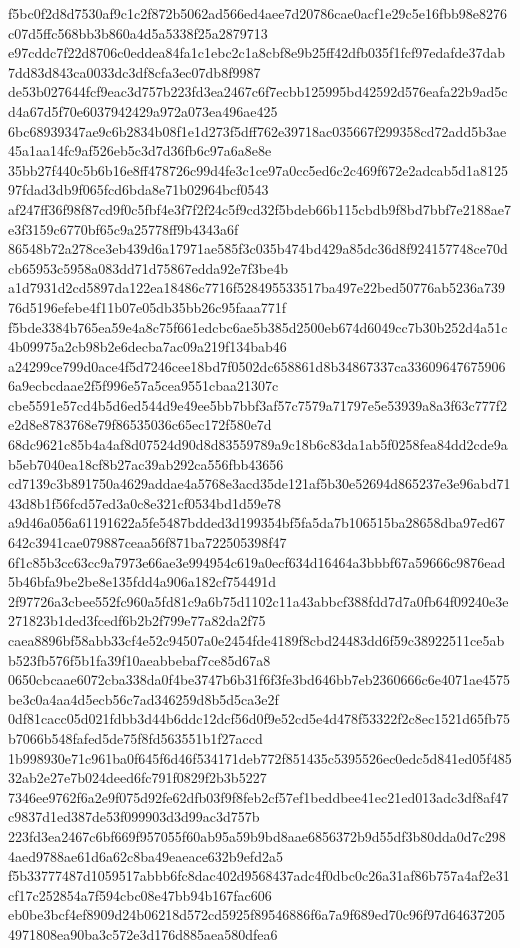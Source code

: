 \documentclass[11pt,a4paper]{article}
\begin{document}
{f5bc0f2d8d7530af9c1c2f872b5062ad566ed4aee7d20786cae0acf1e29c5e16fbb98e8276c07d5ffc568bb3b860a4d5a5338f25a2879713
e97cddc7f22d8706c0eddea84fa1c1ebc2c1a8cbf8e9b25ff42dfb035f1fcf97edafde37dab7dd83d843ca0033dc3df8cfa3ec07db8f9987
de53b027644fcf9eac3d757b223fd3ea2467c6f7ecbb125995bd42592d576eafa22b9ad5cd4a67d5f70e6037942429a972a073ea496ae425
6bc68939347ae9c6b2834b08f1e1d273f5dff762e39718ac035667f299358cd72add5b3ae45a1aa14fc9af526eb5c3d7d36fb6c97a6a8e8e
35bb27f440c5b6b16e8ff478726c99d4fe3c1ce97a0cc5ed6c2c469f672e2adcab5d1a812597fdad3db9f065fcd6bda8e71b02964bcf0543
af247ff36f98f87cd9f0c5fbf4e3f7f2f24c5f9cd32f5bdeb66b115cbdb9f8bd7bbf7e2188ae7e3f3159c6770bf65c9a25778ff9b4343a6f
86548b72a278ce3eb439d6a17971ae585f3c035b474bd429a85dc36d8f924157748ce70dcb65953c5958a083dd71d75867edda92e7f3be4b
a1d7931d2cd5897da122ea18486c7716f528495533517ba497e22bed50776ab5236a73976d5196efebe4f11b07e05db35bb26c95faaa771f
f5bde3384b765ea59e4a8c75f661edcbc6ae5b385d2500eb674d6049cc7b30b252d4a51c4b09975a2cb98b2e6decba7ac09a219f134bab46
a24299ce799d0ace4f5d7246cee18bd7f0502dc658861d8b34867337ca336096476759066a9ecbcdaae2f5f996e57a5cea9551cbaa21307c
cbe5591e57cd4b5d6ed544d9e49ee5bb7bbf3af57c7579a71797e5e53939a8a3f63c777f2e2d8e8783768e79f86535036c65ec172f580e7d
68dc9621c85b4a4af8d07524d90d8d83559789a9c18b6c83da1ab5f0258fea84dd2cde9ab5eb7040ea18cf8b27ac39ab292ca556fbb43656
cd7139c3b891750a4629addae4a5768e3acd35de121af5b30e52694d865237e3e96abd7143d8b1f56fcd57ed3a0c8e321cf0534bd1d59e78
a9d46a056a61191622a5fe5487bdded3d199354bf5fa5da7b106515ba28658dba97ed67642c3941cae079887ceaa56f871ba722505398f47
6f1c85b3cc63cc9a7973e66ae3e994954c619a0ecf634d16464a3bbbf67a59666c9876ead5b46bfa9be2be8e135fdd4a906a182cf754491d
2f97726a3cbee552fc960a5fd81c9a6b75d1102c11a43abbcf388fdd7d7a0fb64f09240e3e271823b1ded3fcedf6b2b2f799e77a82da2f75
caea8896bf58abb33cf4e52c94507a0e2454fde4189f8cbd24483dd6f59c38922511ce5abb523fb576f5b1fa39f10aeabbebaf7ce85d67a8
0650cbcaae6072cba338da0f4be3747b6b31f6f3fe3bd646bb7eb2360666c6e4071ae4575be3c0a4aa4d5ecb56c7ad346259d8b5d5ca3e2f
0df81cacc05d021fdbb3d44b6ddc12dcf56d0f9e52cd5e4d478f53322f2c8ec1521d65fb75b7066b548fafed5de75f8fd563551b1f27accd
1b998930e71c961ba0f645f6d46f534171deb772f851435c5395526ec0edc5d841ed05f48532ab2e27e7b024deed6fc791f0829f2b3b5227
7346ee9762f6a2e9f075d92fe62dfb03f9f8feb2cf57ef1beddbee41ec21ed013adc3df8af47c9837d1ed387de53f099903d3d99ac3d757b
223fd3ea2467c6bf669f957055f60ab95a59b9bd8aae6856372b9d55df3b80dda0d7c2984aed9788ae61d6a62c8ba49eaeace632b9efd2a5
f5b33777487d1059517abbb6fc8dac402d9568437adc4f0dbc0c26a31af86b757a4af2e31cf17c252854a7f594cbc08e47bb94b167fac606
eb0be3bcf4ef8909d24b06218d572cd5925f89546886f6a7a9f689ed70c96f97d646372054971808ea90ba3c572e3d176d885aea580dfea6
}
\end{document}
